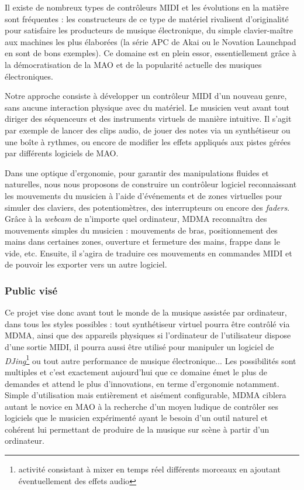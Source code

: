 \par Il existe de nombreux types de contrôleurs MIDI et les évolutions en la matière sont fréquentes : les constructeurs de ce type de matériel rivalisent d'originalité pour satisfaire les producteurs de musique électronique, du simple clavier-maître aux machines les plus élaborées (la série APC de Akai ou le Novation Launchpad en sont de bons exemples). Ce domaine est en plein essor, essentiellement grâce à la démocratisation de la MAO et de la popularité actuelle des musiques électroniques.

\par Notre approche consiste à développer un contrôleur MIDI d'un nouveau genre, sans aucune interaction physique avec du matériel. Le musicien veut avant tout diriger des séquenceurs et des instruments virtuels de manière intuitive. Il s'agit par exemple de lancer des clips audio, de jouer des notes via un synthétiseur ou une boîte à rythmes, ou encore de modifier les effets appliqués aux pistes gérées par différents logiciels de MAO.

\par Dans une optique d'ergonomie, pour garantir des manipulations fluides et naturelles, nous nous proposons de construire un contrôleur logiciel reconnaissant les mouvements du musicien à l'aide d’événements et de zones virtuelles pour simuler des claviers, des potentiomètres, des interrupteurs ou encore des \emph{faders}. Grâce à la \emph{webcam} de n'importe quel ordinateur, MDMA reconnaîtra des mouvements simples du musicien : mouvements de bras, positionnement des mains dans certaines zones, ouverture et fermeture des mains, frappe dans le vide, etc. Ensuite, il s'agira de traduire ces mouvements en commandes MIDI et de pouvoir les exporter vers un autre logiciel.

\subsubsection*{Public visé}

\par Ce projet vise donc avant tout le monde de la musique assistée par ordinateur, dans tous les styles possibles : tout synthétiseur virtuel pourra être contrôlé via MDMA, ainsi que des appareils physiques si l'ordinateur de l'utilisateur dispose d'une sortie MIDI, il pourra aussi être utilisé pour manipuler un logiciel de \emph{DJing}\footnote{activité consistant à mixer en temps réel différents morceaux en ajoutant éventuellement des effets audio} ou tout autre performance de musique électronique... Les possibilités sont multiples et c'est exactement aujourd'hui que ce domaine émet le plus de demandes et attend le plus d'innovations, en terme d'ergonomie notamment. Simple d'utilisation mais entièrement et aisément configurable, MDMA ciblera autant le novice en MAO  à la recherche d'un moyen ludique de contrôler ses logiciels que le musicien expérimenté ayant le besoin d'un outil naturel et cohérent lui permettant de produire de la musique sur scène à partir d'un ordinateur.

